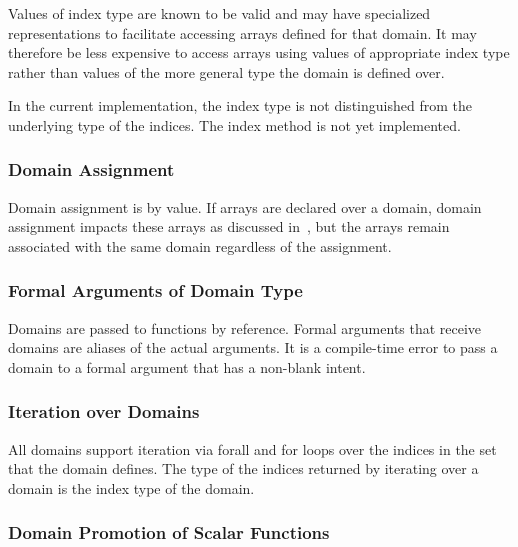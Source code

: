 Values of index type are known to be valid and may have specialized
representations to facilitate accessing arrays defined for that
domain. It may therefore be less expensive to access arrays using
values of appropriate index type rather than values of the more
general type the domain is defined over.

\begin{status}
In the current implementation, the index type is not distinguished
from the underlying type of the indices.  The index method is not yet
implemented.
\end{status}

\subsubsection{Domain Assignment}
\label{Domain_Assignment}

Domain assignment is by value.  If arrays are declared over a domain,
domain assignment impacts these arrays as discussed
in~, but the arrays remain
associated with the same domain regardless of the assignment.

\subsubsection{Formal Arguments of Domain Type}
\label{Formal_Arguments_of_Domain_Type}

Domains are passed to functions by reference.  Formal arguments that
receive domains are aliases of the actual arguments.  It is a
compile-time error to pass a domain to a formal argument that has a
non-blank intent.

\subsubsection{Iteration over Domains}
\label{Iteration_over_Domains}

All domains support iteration via forall and for loops over the
indices in the set that the domain defines.  The type of the indices
returned by iterating over a domain is the index type of the domain.

\subsubsection{Domain Promotion of Scalar Functions}
\label{Domain_Promotion_of_Scalar_Functions}

